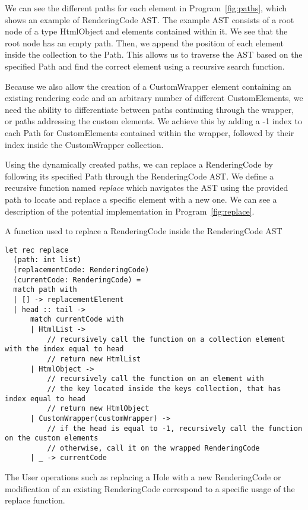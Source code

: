 We can see the different paths for each element in Program~\ref{fig:paths}, which shows an example of RenderingCode AST.
The example AST consists of a root node of a type HtmlObject and elements contained within it.
We see that the root node has an empty path.
Then, we append the position of each element inside the collection to the Path.
This allows us to traverse the AST based on the specified Path and find the correct element using a recursive search function.

Because we also allow the creation of a CustomWrapper element containing an existing rendering code and an arbitrary number of different CustomElements,
we need the ability to differentiate between paths continuing through the wrapper, or paths addressing the custom elements.
We achieve this by adding a -1 index to each Path for CustomElements contained within the wrapper, followed by their index inside the CustomWrapper collection.

Using the dynamically created paths, we can replace a RenderingCode by following its specified Path through the RenderingCode AST.
We define a recursive function named \emph{replace} which navigates the AST using the provided path to locate and replace a specific element with a new one.
We can see a description of the potential implementation in Program~\ref{fig:replace}.

\begin{listing}[htbp]
	\caption {A function used to replace a RenderingCode inside the RenderingCode AST}
	\label{fig:replace}
	\begin{lstlisting}
let rec replace 
  (path: int list) 
  (replacementCode: RenderingCode) 
  (currentCode: RenderingCode) =
  match path with
  | [] -> replacementElement
  | head :: tail ->
      match currentCode with
      | HtmlList ->
          // recursively call the function on a collection element with the index equal to head 
          // return new HtmlList
      | HtmlObject ->
          // recursively call the function on an element with 
          // the key located inside the keys collection, that has index equal to head
          // return new HtmlObject
      | CustomWrapper(customWrapper) -> 
          // if the head is equal to -1, recursively call the function on the custom elements
          // otherwise, call it on the wrapped RenderingCode
      | _ -> currentCode 
  \end{lstlisting}
\end{listing}

The User operations such as replacing a Hole with a new RenderingCode or modification of an existing RenderingCode correspond to a specific usage of the replace function.

